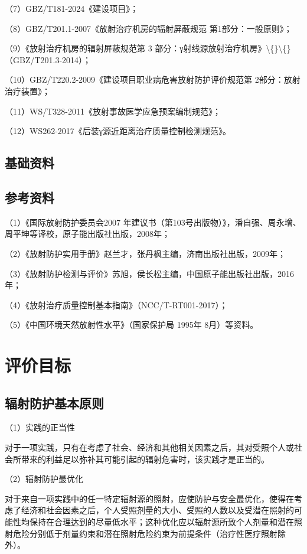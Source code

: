 （7）GBZ/T181-2024《建设项目》；

（8）GBZ/T201.1-2007《放射治疗机房的辐射屏蔽规范 第1部分：一般原则》；

（9）《放射治疗机房的辐射屏蔽规范第 3 部分：γ射线源放射治疗机房》\textbackslash\{\}\textbackslash\{\}（GBZ/T201.3-2014）；

（10）GBZ/T220.2-2009《建设项目职业病危害放射防护评价规范第 2部分：放射治疗装置》；

（11）WS/T328-2011《放射事故医学应急预案编制规范》；

（12）WS262-2017《后装γ源近距离治疗质量控制检测规范》。

\subsection{基础资料}



\subsection{参考资料}

（1）《国际放射防护委员会2007 年建议书（第103号出版物）》，潘自强、周永增、周平坤等译校，原子能出版社出版，2008年；

（2）《放射防护实用手册》赵兰才，张丹枫主编，济南出版社出版，2009年；

（3）《放射防护检测与评价》苏旭，侯长松主编，中国原子能出版社出版，2016年；

（4）《放射治疗质量控制基本指南》（NCC/T-RT001-2017）；

（5）《中国环境天然放射性水平》（国家保护局 1995年 8月）等资料。

\section{评价目标}

\subsection{辐射防护基本原则}

（1）实践的正当性

对于一项实践，只有在考虑了社会、经济和其他相关因素之后，其对受照个人或社会所带来的利益足以弥补其可能引起的辐射危害时，该实践才是正当的。

（2）辐射防护最优化

对于来自一项实践中的任一特定辐射源的照射，应使防护与安全最优化，使得在考虑了经济和社会因素之后，个人受照剂量的大小、受照的人数以及受潜在照射的可能性均保持在合理达到的尽量低水平；这种优化应以辐射源所致个人剂量和潜在照射危险分别低于剂量约束和潜在照射危险约束为前提条件（治疗性医疗照射除外）。

